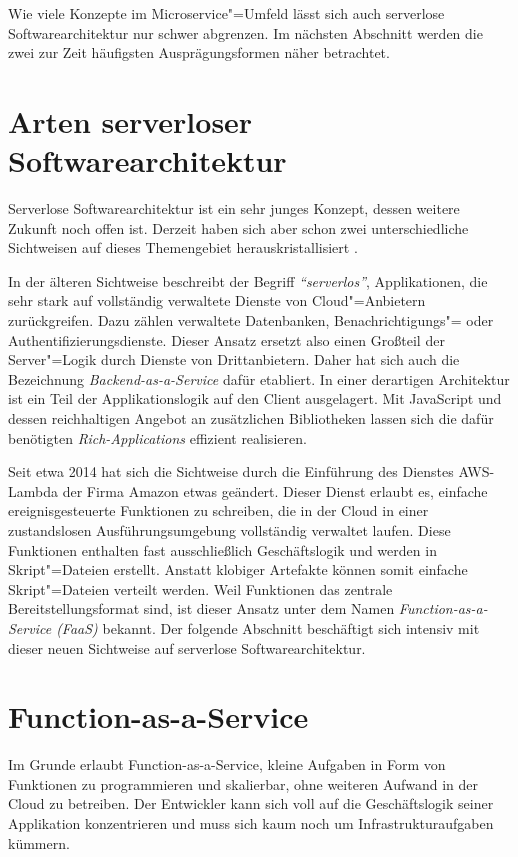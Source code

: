 Wie viele Konzepte im Microservice"=Umfeld lässt sich auch serverlose Softwarearchitektur nur schwer abgrenzen. Im nächsten Abschnitt werden die zwei zur Zeit häufigsten Ausprägungsformen näher betrachtet.

\section{Arten serverloser Softwarearchitektur}

Serverlose Softwarearchitektur ist ein sehr junges Konzept, dessen weitere Zukunft noch offen ist. Derzeit haben sich aber schon zwei unterschiedliche Sichtweisen auf dieses Themengebiet herauskristallisiert \cite{ServerlessArchitectures}.

In der älteren Sichtweise beschreibt der Begriff \textit{"`serverlos"'}, Applikationen, die sehr stark auf vollständig verwaltete Dienste von Cloud"=Anbietern zurückgreifen. Dazu zählen \zB verwaltete Datenbanken, Benachrichtigungs"= oder Authentifizierungsdienste. Dieser Ansatz ersetzt also einen Großteil der Server"=Logik durch Dienste von Drittanbietern. Daher hat sich auch die Bezeichnung \textit{Backend-as-a-Service} dafür etabliert. In einer derartigen Architektur ist ein Teil der Applikationslogik auf den Client ausgelagert. Mit JavaScript und dessen reichhaltigen Angebot an zusätzlichen Bibliotheken lassen sich die dafür benötigten \textit{Rich-Applications} effizient realisieren.

Seit etwa 2014 hat sich die Sichtweise durch die Einführung des Dienstes AWS-Lambda der Firma Amazon etwas geändert. Dieser Dienst erlaubt es, einfache ereignisgesteuerte Funktionen zu schreiben, die in der Cloud in einer zustandslosen Ausführungsumgebung vollständig verwaltet laufen. Diese Funktionen enthalten fast ausschließlich Geschäftslogik und werden in Skript"=Dateien erstellt. Anstatt klobiger Artefakte können somit einfache Skript"=Dateien verteilt werden. Weil Funktionen das zentrale Bereitstellungsformat sind, ist dieser Ansatz unter dem Namen \textit{Function-as-a-Service (FaaS)} bekannt. Der folgende Abschnitt beschäftigt sich intensiv mit dieser neuen Sichtweise auf serverlose Softwarearchitektur.

\section{Function-as-a-Service}

Im Grunde erlaubt Function-as-a-Service, kleine Aufgaben in Form von Funktionen zu programmieren und skalierbar, ohne weiteren Aufwand in der Cloud zu betreiben. Der Entwickler kann sich voll auf die Geschäftslogik seiner Applikation konzentrieren und muss sich kaum noch um Infrastrukturaufgaben kümmern.

